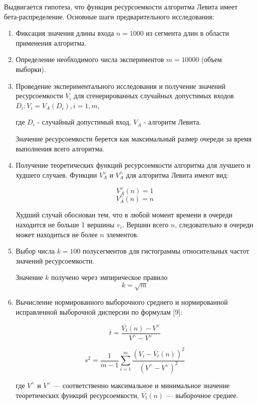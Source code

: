Выдвигается гипотеза, что функция ресурсоемкости алгоритма Левита имеет бета-распределение. Основные шаги предварительного исследования:

\begin{enumerate}
\item Фиксация значения длины входа $n = 1000$ из сегмента длин в области применения алгоритма.

\item Определение необходимого числа экспериментов $m = 10000$ (объем выборки).

\item Проведение экспериментального исследования и получение значений
ресурсоемкости $V_i$ для сгенерированных случайных допустимых входов $D_i: V_i = V_A (D_i), i = \overline{1, m},$

где $D_i$ - случайный допустимый вход, $V_A$ - алгоритм Левита.

Значение ресурсоемкости берется как максимальный размер очереди за время выполнения всего алгоритма.

\item Получение теоретических функций ресурсоемкости алгоритма для лучшего и худшего случаев. Функции $V_{A}^{\vee}$ и $V_{A}^{\wedge}$ для алгоритма Левита имеют вид:

$$V_{A}^{\vee}(n) = 1$$
$$V_{A}^{\wedge}(n) = n$$

Худший случай обоснован тем, что в любой момент времени в очереди находится не больше 1 вершины $v_i$. Вершин всего $n$, следовательно в очереди может находиться не более $n$ элементов.

\item Выбор числа $k = 100$ полусегментов для гистограммы относительных частот значений ресурсоемкости.

Значение $k$ получено через эмпирическое правило $$k = \sqrt{m}$$

\item Вычисление нормированного выборочного среднего и нормированной
исправленной выборочной дисперсии по формулам [9]:

$$\overline{t} = \frac{\overline{V_{t}}(n)- V^{\vee}}{V^{\wedge} - V^{\vee}}$$

$$s^2 = \frac{1}{m - 1} \sum\limits_{i=1}^m \frac{(V_i - \overline{V_t}(n))^2}{(V^{\wedge} - V^{\vee})^2}$$

где $V^{\wedge}$ и $V^{\vee}$ — соответственно максимальное и минимальное значение теоретических функций ресурсоемкости, $\overline{V_{t}}(n)$ — выборочное среднее.


\end{enumerate}
